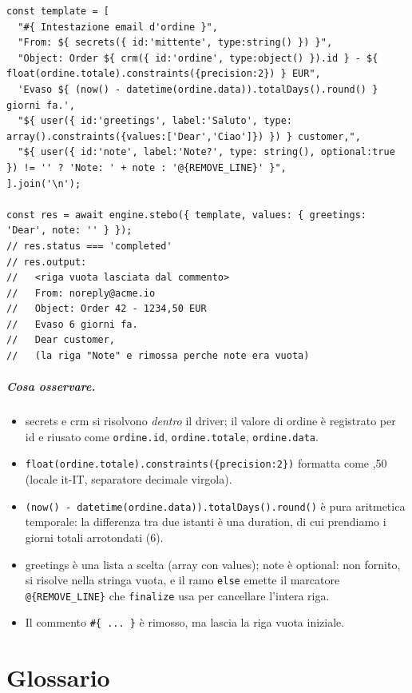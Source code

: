 \documentclass[11pt,a4paper]{book}
\let\code\lstinline
\newcommand{\ic}[1]{{\ttfamily #1}}
\theoremstyle{definition}
\begin{document}
{{{{\begin{lstlisting}
const template = [
  "#{ Intestazione email d'ordine }",
  "From: ${ secrets({ id:'mittente', type:string() }) }",
  "Object: Order ${ crm({ id:'ordine', type:object() }).id } - ${ float(ordine.totale).constraints({precision:2}) } EUR",
  'Evaso ${ (now() - datetime(ordine.data)).totalDays().round() } giorni fa.',
  "${ user({ id:'greetings', label:'Saluto', type: array().constraints({values:['Dear','Ciao']}) }) } customer,",
  "${ user({ id:'note', label:'Note?', type: string(), optional:true }) != '' ? 'Note: ' + note : '@{REMOVE_LINE}' }",
].join('\n');

const res = await engine.stebo({ template, values: { greetings: 'Dear', note: '' } });
// res.status === 'completed'
// res.output:
//   <riga vuota lasciata dal commento>
//   From: noreply@acme.io
//   Object: Order 42 - 1234,50 EUR
//   Evaso 6 giorni fa.
//   Dear customer,
//   (la riga "Note" e rimossa perche note era vuota)
\end{lstlisting}

\paragraph{Cosa osservare.}
\begin{itemize}
  \item \ic{secrets} e \ic{crm} si risolvono \emph{dentro} il driver; il valore di
    \ic{ordine} è registrato per \ic{id} e riusato come \code|ordine.id|,
    \code|ordine.totale|, \code|ordine.data|.
  \item \code|float(ordine.totale).constraints({precision:2})| formatta
    \ic{1234.5} come \ic{1234,50} (locale \ic{it-IT}, separatore decimale virgola).
  \item \code|(now() - datetime(ordine.data)).totalDays().round()| è pura
    aritmetica temporale: la differenza tra due istanti è una \ic{duration}, di cui
    prendiamo i giorni totali arrotondati ($6$).
  \item \ic{greetings} è una lista a scelta (\ic{array} con \ic{values}); \ic{note}
    è \ic{optional}: non fornito, si risolve nella stringa vuota, e il ramo
    \code|else| emette il marcatore \code|@{REMOVE_LINE}| che \code|finalize| usa per
    cancellare l'intera riga.
  \item Il commento \code|#{ ... }| è rimosso, ma lascia la riga vuota iniziale.
\end{itemize}

\chapter{Glossario}
\label{app:glossario}

}}}}
\end{document}
